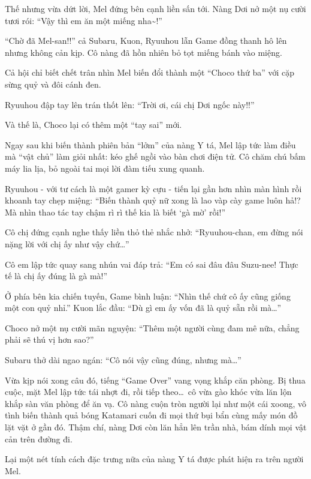 \documentclass[../main.tex]{subfiles}
\begin{document}
Thế nhưng vừa dứt lời, Mel đứng bên cạnh liền sấn tới. Nàng Dơi nở một nụ cười tươi rói: ``Vậy thì em ăn một miếng nha\~{}!''

``Chờ đã Mel-san!!'' cả Subaru, Kuon, Ryuuhou lẫn Game đồng thanh hô lên nhưng không cản kịp. Cô nàng đã hồn nhiên bỏ tọt miếng bánh vào miệng.

Cả hội chỉ biết chết trân nhìn Mel biến đổi thành một ``Choco thứ ba'' với cặp sừng quỷ và đôi cánh đen.

Ryuuhou đập tay lên trán thốt lên: ``Trời ơi, cái chị Dơi ngốc này!!''

Và thế là, Choco lại có thêm một ``tay sai'' mới.

\ct

Ngay sau khi biến thành phiên bản ``lởm'' của nàng Y tá, Mel lập tức làm điều mà ``vật chủ'' làm giỏi nhất: kéo ghế ngồi vào bàn chơi điện tử. Cô chăm chú bấm máy lia lịa, bỏ ngoài tai mọi lời đàm tiếu xung quanh.


Ryuuhou - với tư cách là một gamer kỳ cựu - tiến lại gần hơn nhìn màn hình rồi khoanh tay chẹp miệng: ``Biến thành quỷ nữ xong là lao vàp cày game luôn hả!? Mà nhìn thao tác tay chậm rì rì thế kia là biết `gà mờ' rồi!''

Cô chị đứng cạnh nghe thấy liền thỏ thẻ nhắc nhở: ``Ryuuhou-chan, em đừng nói nặng lời với chị ấy như vậy chứ\dots''

Cô em lập tức quay sang nhún vai đáp trả: ``Em có sai đâu đâu Suzu-nee! Thực tế là chị ấy đúng là gà mà!''

Ở phía bên kia chiến tuyến, Game bình luận: ``Nhìn thế chứ cô ấy cũng giống một con quỷ nhỉ.'' Kuon lắc đầu: ``Dù gì em ấy vốn đã là quỷ sẵn rồi mà\dots''

Choco nở một nụ cười mãn nguyện: ``Thêm một người cùng đam mê nữa, chẳng phải sẽ thú vị hơn sao?''

Subaru thở dài ngao ngán: ``Cô nói vậy cũng đúng, nhưng mà\dots''

Vừa kịp nói xong câu đó, tiếng ``Game Over'' vang vọng khắp căn phòng. Bị thua cuộc, mặt Mel lập tức tái nhợt đi, rồi tiếp theo\dots\ cô vừa gào khóc vừa lăn lộn khắp sàn văn phòng để ăn vạ. Cô nàng cuộn tròn người lại như một cái xoong, vô tình biến thành quả bóng Katamari cuốn đi mọi thứ bụi bẩn cùng mấy món đồ lặt vặt ở gần đó. Thậm chí, nàng Dơi còn lăn hẳn lên trần nhà, bám dính mọi vật cản trên đường đi.


Lại một nét tính cách đặc trưng nữa của nàng Y tá được phát hiện ra trên người Mel.
\end{document}

